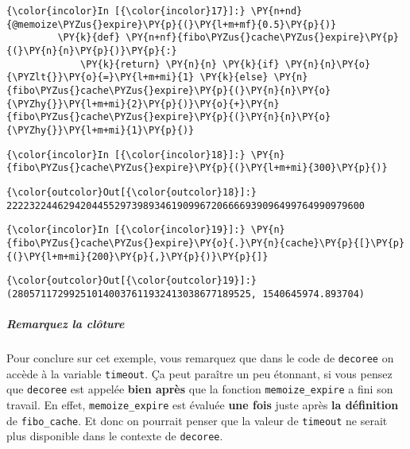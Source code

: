     \begin{Verbatim}[commandchars=\\\{\},frame=single,framerule=0.3mm,rulecolor=\color{cellframecolor}]
{\color{incolor}In [{\color{incolor}17}]:} \PY{n+nd}{@memoize\PYZus{}expire}\PY{p}{(}\PY{l+m+mf}{0.5}\PY{p}{)}
         \PY{k}{def} \PY{n+nf}{fibo\PYZus{}cache\PYZus{}expire}\PY{p}{(}\PY{n}{n}\PY{p}{)}\PY{p}{:}
             \PY{k}{return} \PY{n}{n} \PY{k}{if} \PY{n}{n}\PY{o}{\PYZlt{}}\PY{o}{=}\PY{l+m+mi}{1} \PY{k}{else} \PY{n}{fibo\PYZus{}cache\PYZus{}expire}\PY{p}{(}\PY{n}{n}\PY{o}{\PYZhy{}}\PY{l+m+mi}{2}\PY{p}{)}\PY{o}{+}\PY{n}{fibo\PYZus{}cache\PYZus{}expire}\PY{p}{(}\PY{n}{n}\PY{o}{\PYZhy{}}\PY{l+m+mi}{1}\PY{p}{)}
\end{Verbatim}


    \begin{Verbatim}[commandchars=\\\{\},frame=single,framerule=0.3mm,rulecolor=\color{cellframecolor}]
{\color{incolor}In [{\color{incolor}18}]:} \PY{n}{fibo\PYZus{}cache\PYZus{}expire}\PY{p}{(}\PY{l+m+mi}{300}\PY{p}{)}
\end{Verbatim}


\begin{Verbatim}[commandchars=\\\{\},frame=single,framerule=0.3mm,rulecolor=\color{cellframecolor}]
{\color{outcolor}Out[{\color{outcolor}18}]:} 222232244629420445529739893461909967206666939096499764990979600
\end{Verbatim}
            
    \begin{Verbatim}[commandchars=\\\{\},frame=single,framerule=0.3mm,rulecolor=\color{cellframecolor}]
{\color{incolor}In [{\color{incolor}19}]:} \PY{n}{fibo\PYZus{}cache\PYZus{}expire}\PY{o}{.}\PY{n}{cache}\PY{p}{[}\PY{p}{(}\PY{l+m+mi}{200}\PY{p}{,}\PY{p}{)}\PY{p}{]}
\end{Verbatim}


\begin{Verbatim}[commandchars=\\\{\},frame=single,framerule=0.3mm,rulecolor=\color{cellframecolor}]
{\color{outcolor}Out[{\color{outcolor}19}]:} (280571172992510140037611932413038677189525, 1540645974.893704)
\end{Verbatim}
            
    \hypertarget{remarquez-la-cluxf4ture}{%
\subparagraph{Remarquez la clôture}\label{remarquez-la-cluxf4ture}}

    Pour conclure sur cet exemple, vous remarquez que dans le code de
\texttt{decoree} on accède à la variable \texttt{timeout}. Ça peut
paraître un peu étonnant, si vous pensez que \texttt{decoree} est
appelée \textbf{bien après} que la fonction \texttt{memoize\_expire} a
fini son travail. En effet, \texttt{memoize\_expire} est évaluée
\textbf{une fois} juste après \textbf{la définition} de
\texttt{fibo\_cache}. Et donc on pourrait penser que la valeur de
\texttt{timeout} ne serait plus disponible dans le contexte de
\texttt{decoree}.

